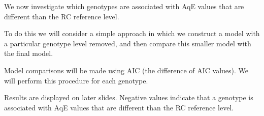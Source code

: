\documentclass[
  ignorenonframetext,
]{beamer}
\begin{document}
\begin{frame}{}
\protect\hypertarget{section-17}{}
We now investigate which genotypes are associated with AqE values that
are different than the RC reference level.

To do this we will consider a simple approach in which we construct a
model with a particular genotype level removed, and then compare this
smaller model with the final model.

Model comparisons will be made using AIC (the difference of AIC values).
We will perform this procedure for each genotype.

Results are displayed on later slides. Negative values indicate that a
genotype is associated with AqE values that are different than the RC
reference level.
\end{frame}
\end{document}
